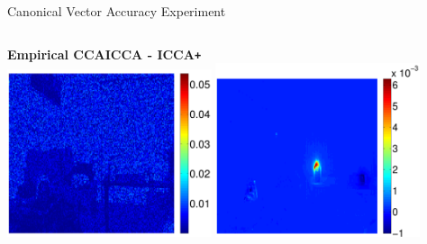 \documentclass[8pt]{beamer}
\newcommand{\iccap}{ICCA\texttt{+} }
\begin{document}
\begin{frame}{Canonical Vector Accuracy Experiment}
\begin{columns}[T]
\begin{column}{0.7\textwidth}
\begin{center}
      \hspace{-2ex}\textbf{Empirical CCA}\hspace{13ex}\textbf{ICCA - \iccap}\\
      \includegraphics[width=0.45\textwidth]{figures/flashing1_left1_cca.pdf}\hspace{2ex}
      \includegraphics[width=0.45\textwidth]{figures/flashing1_left1_diff_icca.pdf}
    \end{center}
  \end{column}
\end{columns}
\end{frame}
\end{document}
